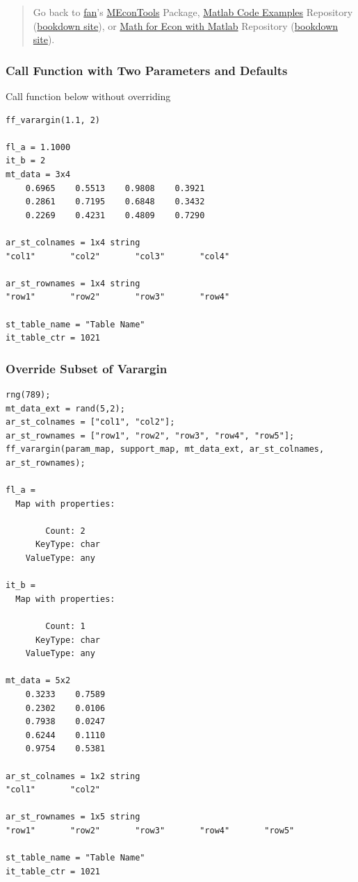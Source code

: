 \documentclass[
]{book}
\begin{document}
\begin{quote}
Go back to \href{http://fanwangecon.github.io/}{fan}'s \href{https://fanwangecon.github.io/MEconTools/}{MEconTools} Package, \href{https://fanwangecon.github.io/M4Econ/}{Matlab Code Examples} Repository (\href{https://fanwangecon.github.io/M4Econ/bookdown}{bookdown site}), or \href{https://fanwangecon.github.io/Math4Econ/}{Math for Econ with Matlab} Repository (\href{https://fanwangecon.github.io/Math4Econ/bookdown}{bookdown site}).
\end{quote}

\hypertarget{call-function-with-two-parameters-and-defaults}{%
\subsubsection{Call Function with Two Parameters and Defaults}\label{call-function-with-two-parameters-and-defaults}}

Call function below without overriding

\begin{verbatim}
ff_varargin(1.1, 2)

fl_a = 1.1000
it_b = 2
mt_data = 3x4    
    0.6965    0.5513    0.9808    0.3921
    0.2861    0.7195    0.6848    0.3432
    0.2269    0.4231    0.4809    0.7290

ar_st_colnames = 1x4 string    
"col1"       "col2"       "col3"       "col4"       

ar_st_rownames = 1x4 string    
"row1"       "row2"       "row3"       "row4"       

st_table_name = "Table Name"
it_table_ctr = 1021
\end{verbatim}

\hypertarget{override-subset-of-varargin}{%
\subsubsection{Override Subset of Varargin}\label{override-subset-of-varargin}}

\begin{verbatim}
rng(789);
mt_data_ext = rand(5,2);
ar_st_colnames = ["col1", "col2"];
ar_st_rownames = ["row1", "row2", "row3", "row4", "row5"];
ff_varargin(param_map, support_map, mt_data_ext, ar_st_colnames, ar_st_rownames);

fl_a = 
  Map with properties:

        Count: 2
      KeyType: char
    ValueType: any

it_b = 
  Map with properties:

        Count: 1
      KeyType: char
    ValueType: any

mt_data = 5x2    
    0.3233    0.7589
    0.2302    0.0106
    0.7938    0.0247
    0.6244    0.1110
    0.9754    0.5381

ar_st_colnames = 1x2 string    
"col1"       "col2"       

ar_st_rownames = 1x5 string    
"row1"       "row2"       "row3"       "row4"       "row5"       

st_table_name = "Table Name"
it_table_ctr = 1021
\end{verbatim}
\end{document}
